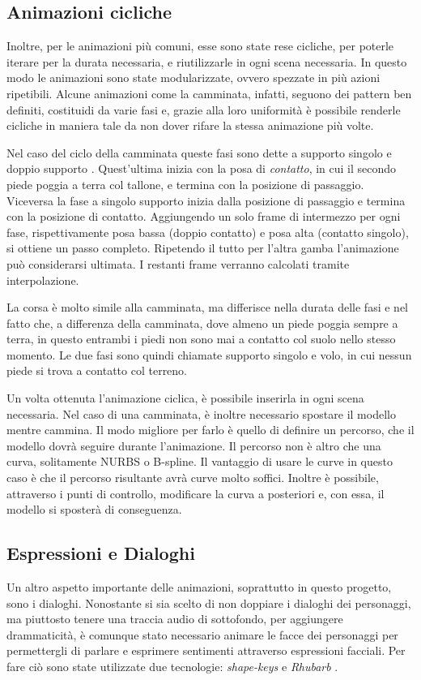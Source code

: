 \subsection{Animazioni cicliche}
Inoltre, per le animazioni più comuni, esse sono state rese cicliche, per poterle iterare per la durata necessaria, e riutilizzarle in ogni scena necessaria.
In questo modo le animazioni sono state modularizzate, ovvero spezzate in più azioni ripetibili.
Alcune animazioni come la camminata, infatti, seguono dei pattern ben definiti, costituidi da varie fasi e,
grazie alla loro uniformità è possibile renderle cicliche in maniera tale da non dover rifare la stessa animazione più volte.

Nel caso del ciclo della camminata queste fasi sono dette a supporto singolo e doppio supporto \cite{Parent:2012:CAA:2385444}.
Quest'ultima inizia con la posa di \emph{contatto}, in cui il secondo piede poggia a terra col tallone, e termina con la posizione di passaggio.
Viceversa la fase a singolo supporto inizia dalla posizione di passaggio e termina con la posizione di contatto.
Aggiungendo un solo frame di intermezzo per ogni fase, rispettivamente posa bassa (doppio contatto) e posa alta (contatto singolo), si ottiene un passo completo. Ripetendo il tutto per l'altra gamba l'animazione può considerarsi ultimata. I restanti frame verranno calcolati tramite interpolazione.

La corsa è molto simile alla camminata, ma differisce nella durata delle fasi e nel fatto che, a differenza della camminata, dove almeno un piede poggia sempre a terra, in questo entrambi i piedi non sono mai a contatto col suolo nello stesso momento.
Le due fasi sono quindi chiamate supporto singolo e volo, in cui nessun piede si trova a contatto col terreno.

Un volta ottenuta l'animazione ciclica, è possibile inserirla in ogni scena necessaria.
Nel caso di una camminata, è inoltre necessario spostare il modello mentre cammina.
Il modo migliore per farlo è quello di definire un percorso, che il modello dovrà seguire durante l'animazione.
Il percorso non è altro che una curva, solitamente NURBS o B-spline.
Il vantaggio di usare le curve in questo caso è che il percorso risultante avrà curve molto soffici.
Inoltre è possibile, attraverso i punti di controllo, modificare la curva a posteriori e, con essa, il modello si sposterà di conseguenza.

\subsection{Espressioni e Dialoghi}
Un altro aspetto importante delle animazioni, soprattutto in questo progetto, sono i dialoghi.
Nonostante si sia scelto di non doppiare i dialoghi dei personaggi, ma piuttosto tenere una traccia audio di sottofondo, per aggiungere drammaticità, è comunque stato necessario animare le facce dei personaggi per permettergli di parlare e esprimere sentimenti attraverso espressioni facciali.
Per fare ciò sono state utilizzate due tecnologie: \emph{shape-keys} \cite{blendDoc} e \emph{Rhubarb} \cite{blendRhubarb}.

